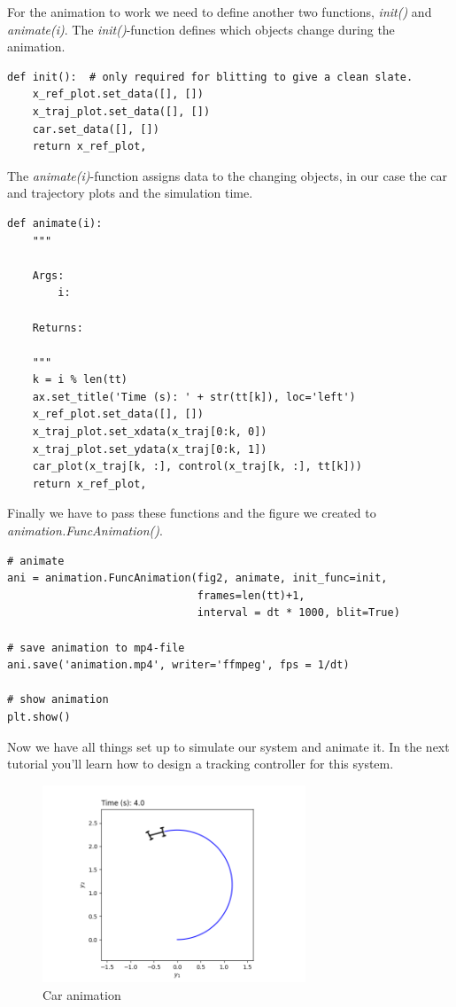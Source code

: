 \documentclass{article}
\begin{document}
For the animation to work we need to define another two functions, \emph{init()} and \emph{animate(i)}. The \emph{init()}-function defines which objects change during the animation.
\begin{lstlisting}
def init():  # only required for blitting to give a clean slate.
    x_ref_plot.set_data([], [])
    x_traj_plot.set_data([], [])
    car.set_data([], [])
    return x_ref_plot,
\end{lstlisting}
The \emph{animate(i)}-function assigns data to the changing objects, in our case the car and trajectory plots and the simulation time.
\begin{lstlisting}
def animate(i):
    """

    Args:
        i:

    Returns:

    """
    k = i % len(tt)
    ax.set_title('Time (s): ' + str(tt[k]), loc='left')
    x_ref_plot.set_data([], [])
    x_traj_plot.set_xdata(x_traj[0:k, 0])
    x_traj_plot.set_ydata(x_traj[0:k, 1])
    car_plot(x_traj[k, :], control(x_traj[k, :], tt[k]))
    return x_ref_plot,
\end{lstlisting}
Finally we have to pass these functions and the figure we created to \emph{animation.FuncAnimation()}.
\begin{lstlisting}
# animate
ani = animation.FuncAnimation(fig2, animate, init_func=init, 
                              frames=len(tt)+1,
                              interval = dt * 1000, blit=True)
                              
# save animation to mp4-file
ani.save('animation.mp4', writer='ffmpeg', fps = 1/dt)

# show animation
plt.show()
\end{lstlisting}
Now we have all things set up to simulate our system and animate it. In the next tutorial you'll learn how to design a tracking controller for this system.
\begin{figure}[ht]
	\centering
	\includegraphics[width=0.7\textwidth]{img/animation}
	\caption{Car animation}
	\label{fig:animation}
\end{figure}
\end{document}
